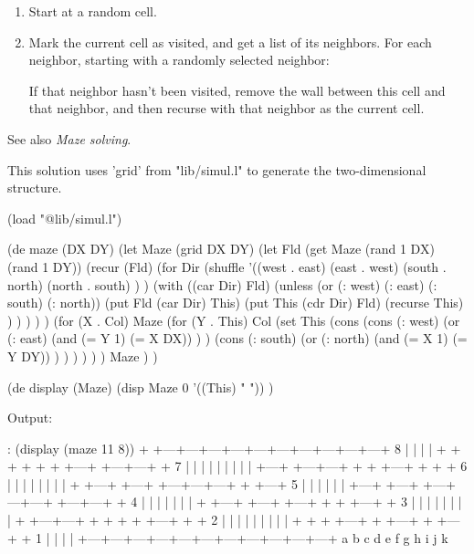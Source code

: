 \begin{enumerate}
\item
  Start at a random cell.
\item
  Mark the current cell as visited, and get a list of its neighbors. For
  each neighbor, starting with a randomly selected neighbor:

  If that neighbor hasn't been visited, remove the wall between this
  cell and that neighbor, and then recurse with that neighbor as the
  current cell.
\end{enumerate}

See also \emph{Maze solving}.


\begin{wideverbatim}

This solution uses 'grid' from "lib/simul.l" to generate the two-dimensional
structure.

(load "@lib/simul.l")

(de maze (DX DY)
   (let Maze (grid DX DY)
      (let Fld (get Maze (rand 1 DX) (rand 1 DY))
         (recur (Fld)
            (for Dir (shuffle '((west . east) (east . west)
                                (south . north) (north . south) ) )
               (with ((car Dir) Fld)
                  (unless (or (: west) (: east) (: south) (: north))
                     (put Fld (car Dir) This)
                     (put This (cdr Dir) Fld)
                     (recurse This) ) ) ) ) )
      (for (X . Col) Maze
         (for (Y . This) Col
            (set This
               (cons
                  (cons
                     (: west)
                     (or
                        (: east)
                        (and (= Y 1) (= X DX)) ) )
                  (cons
                     (: south)
                     (or
                        (: north)
                        (and (= X 1) (= Y DY)) ) ) ) ) ) )
      Maze ) )

(de display (Maze)
   (disp Maze 0 '((This) "   ")) )

\end{wideverbatim}

\begin{wideverbatim}


Output:

: (display (maze 11 8))
   +   +---+---+---+---+---+---+---+---+---+---+
 8 |           |       |                       |
   +   +   +   +   +   +   +---+   +---+---+   +
 7 |   |   |       |   |   |       |       |   |
   +---+   +---+---+   +   +   +---+   +   +   +
 6 |   |       |       |   |           |   |   |
   +   +---+   +---+   +---+---+---+   +   +---+
 5 |       |       |               |   |       |
   +---+   +---+   +---+---+---+   +---+---+   +
 4 |   |       |       |       |   |           |
   +   +---+   +---+   +---+   +   +   +---+   +
 3 |       |       |   |       |   |       |   |
   +   +---+---+   +   +   +   +   +---+   +   +
 2 |       |       |   |   |   |   |       |   |
   +   +   +   +---+   +   +---+   +   +---+   +
 1 |   |               |               |
   +---+---+---+---+---+---+---+---+---+---+---+
     a   b   c   d   e   f   g   h   i   j   k

\end{wideverbatim}

